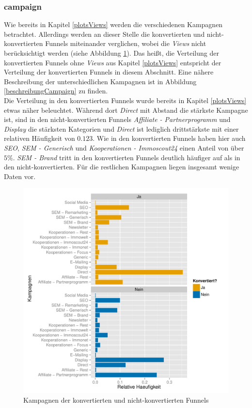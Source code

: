 \subsubsection*{campaign}
Wie bereits in Kapitel \ref{plotsViews} werden die verschiedenen Kampagnen betrachtet. Allerdings werden an dieser Stelle die konvertierten und nicht-konvertierten Funnels miteinander verglichen, wobei die \textit{Views} nicht berücksichtigt werden (siehe Abbildung \ref{campaign}). Das heißt, die Verteilung der konvertierten Funnels ohne \textit{Views} aus Kapitel \ref{plotsViews} entspricht der Verteilung der konvertierten Funnels in diesem Abschnitt. Eine nähere Beschreibung der unterschiedlichen Kampagnen ist in Abbildung \ref{beschreibungCampaign} zu finden.\\
Die Verteilung in den konvertierten Funnels wurde bereits in Kapitel \ref{plotsViews} etwas näher beleuchtet. Während dort \textit{Direct} mit Abstand die stärkste Kampagne ist, sind in den nicht-konvertierten Funnels \textit{Affiliate - Partnerprogramm} und \textit{Display} die stärksten Kategorien und \textit{Direct} ist lediglich drittstärkste mit einer relativen Häufigkeit von $ 0.123 $. Wie in den konvertierten Funnels haben hier auch \textit{SEO}, \textit{SEM - Generisch} und \textit{Kooperationen - Immoscout24} einen Anteil von über $5 \%$. \textit{SEM - Brand} tritt in den konvertierten Funnels deutlich häufiger auf als in den nicht-konvertierten. Für die restlichen Kampagnen liegen insgesamt wenige Daten vor.

\begin{figure}[H]
	\centering
	\includegraphics[scale=0.6]{campaign.pdf}
	\caption{Kampagnen der konvertierten und nicht-konvertierten Funnels}
	\label{campaign}
\end{figure}
    
